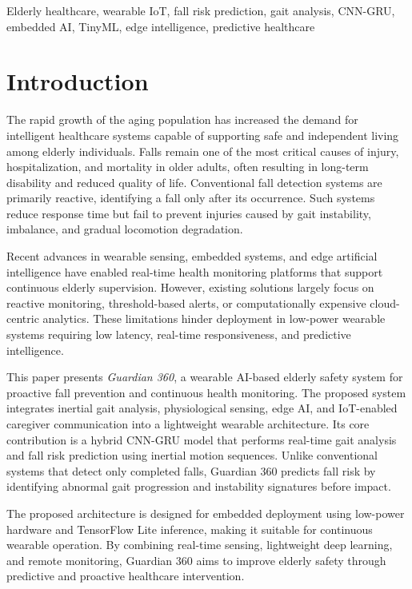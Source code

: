 \documentclass[conference]{IEEEtran}
\begin{document}
\begin{IEEEkeywords}
Elderly healthcare, wearable IoT, fall risk prediction, gait analysis, CNN-GRU, embedded AI, TinyML, edge intelligence, predictive healthcare
\end{IEEEkeywords}

\section{Introduction}
The rapid growth of the aging population has increased the demand for intelligent healthcare systems capable of supporting safe and independent living among elderly individuals. Falls remain one of the most critical causes of injury, hospitalization, and mortality in older adults, often resulting in long-term disability and reduced quality of life. Conventional fall detection systems are primarily reactive, identifying a fall only after its occurrence. Such systems reduce response time but fail to prevent injuries caused by gait instability, imbalance, and gradual locomotion degradation.

Recent advances in wearable sensing, embedded systems, and edge artificial intelligence have enabled real-time health monitoring platforms that support continuous elderly supervision. However, existing solutions largely focus on reactive monitoring, threshold-based alerts, or computationally expensive cloud-centric analytics. These limitations hinder deployment in low-power wearable systems requiring low latency, real-time responsiveness, and predictive intelligence.

This paper presents \textit{Guardian 360}, a wearable AI-based elderly safety system for proactive fall prevention and continuous health monitoring. The proposed system integrates inertial gait analysis, physiological sensing, edge AI, and IoT-enabled caregiver communication into a lightweight wearable architecture. Its core contribution is a hybrid CNN-GRU model that performs real-time gait analysis and fall risk prediction using inertial motion sequences. Unlike conventional systems that detect only completed falls, Guardian 360 predicts fall risk by identifying abnormal gait progression and instability signatures before impact.

The proposed architecture is designed for embedded deployment using low-power hardware and TensorFlow Lite inference, making it suitable for continuous wearable operation. By combining real-time sensing, lightweight deep learning, and remote monitoring, Guardian 360 aims to improve elderly safety through predictive and proactive healthcare intervention.
\end{document}
